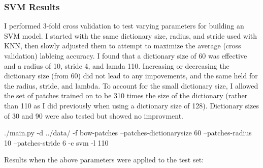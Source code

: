 \documentclass[fleqn]{article}
\begin{document}
\subsubsection{SVM Results}
I performed 3-fold cross validation to test varying parameters for building an SVM model.  I started with the same dictionary size, radius, and stride used with KNN, then slowly adjusted them to attempt to maximize the average (cross validation) lableing accuracy.  I found that a dictionary size of 60 was effective and a radius of 10, stride 4, and lamda 110.  Increasing or decreasing the dictionary size (from 60) did not lead to any impovements, and the same held for the radius, stride, and lambda.  To account for the small dictionary size, I allowed the set of patches trained on to be 310 times the size of the dictionary (rather than 110 as I did previously when using a dictionary size of 128).  Dictionary sizes of 30 and 90 were also tested but showed no improvment.
\begin{solution}
    ./main.py -d ../data/ -f bow-patches --patches-dictionarysize 60 --patches-radius 10 --patches-stride 6  -c svm -l 110
\end{solution}
Results when the above parameters were applied to the test set:
\end{document}
